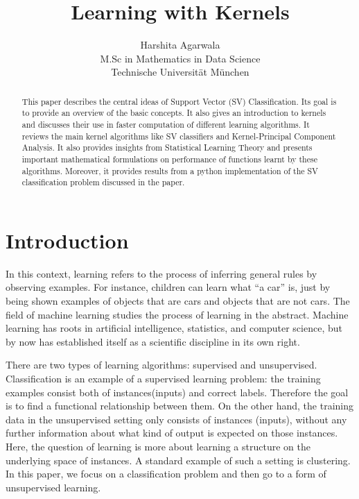 \documentclass{article}
\title{Learning with Kernels}
\author{
  Harshita Agarwala\\
  M.Sc in Mathematics in Data Science\\
  Technische Universität München}
\begin{document}
\maketitle
\begin{abstract}
This paper describes the central ideas of Support Vector (SV) Classification. Its goal is to provide an overview of the basic concepts. It also gives an introduction to kernels and discusses their use in faster computation of different learning algorithms. It reviews the main kernel algorithms like SV classifiers and Kernel-Principal Component Analysis. It also provides insights from Statistical Learning Theory and presents important mathematical formulations on performance of functions learnt by these algorithms. Moreover, it provides results from a python implementation of the SV classification problem discussed in the paper.
\end{abstract}

\pagebreak
\tableofcontents
\pagebreak



\section{Introduction}
In this context, learning refers to the process of inferring general rules by observing examples. For instance, children can learn what “a car” is, just by being shown examples of objects that are cars and objects that are not cars. The field of machine learning studies the process of learning in the abstract. Machine learning has roots in artificial intelligence, statistics, and computer science, but by now has established itself as a scientific discipline in its own right.

There are two types of learning algorithms: supervised and unsupervised. Classification is an example of a supervised learning problem: the training examples consist both of instances(inputs) and correct labels. Therefore the goal is to find a functional relationship between them. On the other hand, the training data in the unsupervised setting only
consists of instances (inputs), without any further information about what kind of output is expected on those instances. Here, the question of learning is more about learning a structure on the underlying space of instances. A standard example of such a setting is clustering. In this paper, we focus on a classification problem and then go to a form of unsupervised learning.
\end{document}
